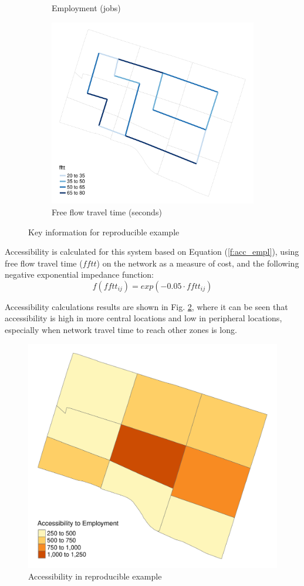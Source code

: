 \documentclass[]{elsarticle} %
\begin{document}
\begin{figure}
\begin{subfigure}{0.48\textwidth}
  \caption{Employment (jobs) }
\end{subfigure}\vspace{10pt}
 \begin{subfigure}{\textwidth}
  \centering
  \includegraphics[width=0.48\linewidth]{Plots/map_network.pdf}  
  \caption{Free flow travel time (seconds)}
\end{subfigure}
\caption{Key information for reproducible example}
  \label{map-data-reproducible-example}
\end{figure}

Accessibility is calculated for this system based on Equation
(\ref{f:acc_empl}), using free flow travel time (\(fftt\)) on the
network as a measure of cost, and the following negative exponential
impedance function: \[
f(fftt_{ij}) = exp(-0.05\cdot fftt_{ij})
\]

Accessibility calculations results are shown in Fig.
\ref{accessibility-reproducible-example}, where it can be seen that
accessibility is high in more central locations and low in peripheral
locations, especially when network travel time to reach other zones is
long.

\begin{figure}
  \centering
  \includegraphics[width=0.8\linewidth]{Plots/map_accessibility.pdf}  
  \caption{Accessibility in reproducible example}
  \label{accessibility-reproducible-example}
\end{figure}
\end{document}
